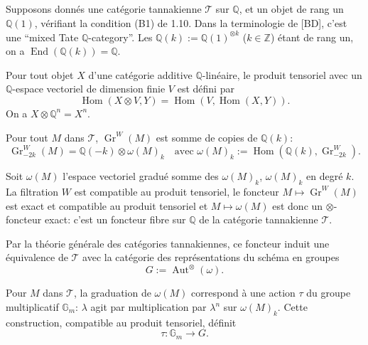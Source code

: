 \documentclass[12pt,a4paper]{article}
\theoremstyle{plain}
\theoremstyle{definition}
\theoremstyle{remark}
\DeclareMathOperator{\Hom}{Hom}
\DeclareMathOperator{\End}{End}
\DeclareMathOperator{\Aut}{Aut}
\newcommand{\Q}{\mathbb{Q}}
\newcommand{\Z}{\mathbb{Z}}
\newcommand{\Gm}{\mathbb{G}_m}
\begin{document}
\subsection{}

Supposons donn{\'e}s une cat{\'e}gorie tannakienne $\mathcal{T}$ sur $\Q$, et un objet de rang un $\Q(1)$, v{\'e}rifiant la condition (B1) de 1.10. Dans la terminologie de [BD], c'est une ``mixed Tate $\Q$-category''. Les $\Q(k):=\Q(1)^{\otimes k}$ ($k\in\Z$) {\'e}tant de rang un, on a $\End(\Q(k))=\Q$.

Pour tout objet $X$ d'une cat{\'e}gorie additive $\Q$-lin{\'e}aire, le produit tensoriel avec un $\Q$-espace vectoriel de dimension finie $V$ est d{\'e}fini par
\begin{equation*}
\Hom(X\otimes V, Y) = \Hom(V,\Hom(X,Y)).
\end{equation*}
On a $X\otimes\Q^n=X^n$.

Pour tout $M$ dans $\mathcal{T}$, $\operatorname{Gr}^W(M)$ est somme de copies de $\Q(k)$:
\begin{equation}\label{eq:2.1.1}
\operatorname{Gr}^W_{-2k}(M) = \Q(-k)\otimes\omega(M)_k \quad \text{avec } \omega(M)_k:=\Hom(\Q(k),\operatorname{Gr}^W_{-2k}).
\tag{2.1.1}
\end{equation}

Soit $\omega(M)$ l'espace vectoriel gradu{\'e} somme des $\omega(M)_k$, $\omega(M)_k$ en degr{\'e} $k$. La filtration $W$ est compatible au produit tensoriel, le foncteur $M\mapsto\operatorname{Gr}^W(M)$ est exact et compatible au produit tensoriel et $M\mapsto\omega(M)$ est donc un $\otimes$-foncteur exact: c'est un foncteur fibre sur $\Q$ de la cat{\'e}gorie tannakienne $\mathcal{T}$.

Par la th{\'e}orie g{\'e}n{\'e}rale des cat{\'e}gories tannakiennes, ce foncteur induit une {\'e}quivalence de $\mathcal{T}$ avec la cat{\'e}gorie des repr{\'e}sentations du sch{\'e}ma en groupes
\begin{equation}\label{eq:2.1.2}
G := \Aut^\otimes(\omega).
\tag{2.1.2}
\end{equation}

Pour $M$ dans $\mathcal{T}$, la graduation de $\omega(M)$ correspond {\`a} une action $\tau$ du groupe multiplicatif $\Gm$: $\lambda$ agit par multiplication par $\lambda^n$ sur $\omega(M)_k$. Cette construction, compatible au produit tensoriel, d{\'e}finit
\begin{equation*}
\tau : \Gm \longrightarrow G.
\end{equation*}
\end{document}

